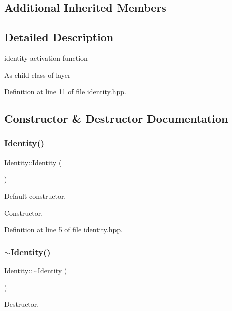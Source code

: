 \subsection*{Additional Inherited Members}


\subsection{Detailed Description}
identity activation function 

As child class of layer 

Definition at line 11 of file identity.\+hpp.



\subsection{Constructor \& Destructor Documentation}
\mbox{\label{class_identity_a160593ab7066d1ce0677a75bd4263d2f}} 
\subsubsection{\texorpdfstring{Identity()}{Identity()}}
{\footnotesize\ttfamily Identity\+::\+Identity (\begin{DoxyParamCaption}{ }\end{DoxyParamCaption})}



Default constructor. 

Constructor. 

Definition at line 5 of file identity.\+hpp.

\mbox{\label{class_identity_ae2d2f09e464b093543e398e42669088c}} 
\subsubsection{\texorpdfstring{$\sim$\+Identity()}{~Identity()}}
{\footnotesize\ttfamily Identity\+::$\sim$\+Identity (\begin{DoxyParamCaption}{ }\end{DoxyParamCaption})}



Destructor. 



